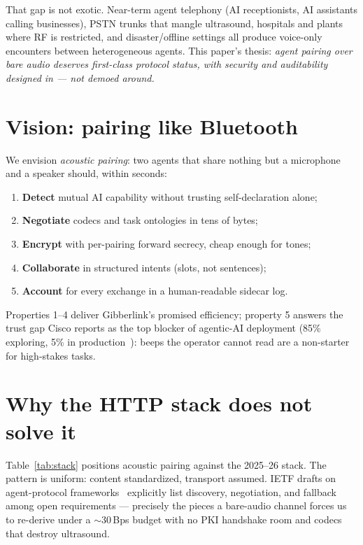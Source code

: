 \documentclass[10pt,twocolumn]{article}
\begin{document}
That gap is not exotic. Near-term agent telephony (AI receptionists, AI
assistants calling businesses), PSTN trunks that mangle ultrasound, hospitals
and plants where RF is restricted, and disaster/offline settings all produce
voice-only encounters between heterogeneous agents. This paper's thesis:
\emph{agent pairing over bare audio deserves first-class protocol status, with
security and auditability designed in --- not demoed around.}

\section{Vision: pairing like Bluetooth}
We envision \emph{acoustic pairing}: two agents that share nothing but a
microphone and a speaker should, within seconds:
\begin{enumerate}
\item \textbf{Detect} mutual AI capability without trusting self-declaration alone;
\item \textbf{Negotiate} codecs and task ontologies in tens of bytes;
\item \textbf{Encrypt} with per-pairing forward secrecy, cheap enough for tones;
\item \textbf{Collaborate} in structured intents (slots, not sentences);
\item \textbf{Account} for every exchange in a human-readable sidecar log.
\end{enumerate}
Properties 1--4 deliver Gibberlink's promised efficiency; property 5 answers
the trust gap Cisco reports as the top blocker of agentic-AI deployment (85\%
exploring, 5\% in production~\cite{ciscotrust}): beeps the operator cannot read
are a non-starter for high-stakes tasks.

\section{Why the HTTP stack does not solve it}
Table~\ref{tab:stack} positions acoustic pairing against the 2025--26 stack.
The pattern is uniform: content standardized, transport assumed. IETF drafts on
agent-protocol frameworks~\cite{ietf-agents} explicitly list discovery,
negotiation, and fallback among open requirements --- precisely the pieces a
bare-audio channel forces us to re-derive under a $\sim$30\,Bps budget with no
PKI handshake room and codecs that destroy ultrasound.
\end{document}
